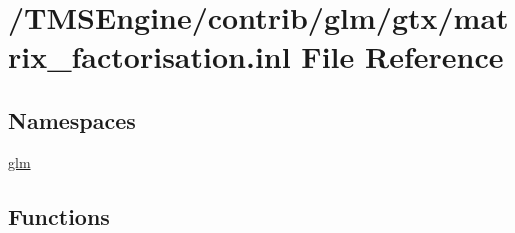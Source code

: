 \hypertarget{matrix__factorisation_8inl}{}\section{/\+T\+M\+S\+Engine/contrib/glm/gtx/matrix\+\_\+factorisation.inl File Reference}
\label{matrix__factorisation_8inl}
\subsection*{Namespaces}
\begin{DoxyCompactItemize}
\item 
 \hyperlink{namespaceglm}{glm}
\end{DoxyCompactItemize}
\subsection*{Functions}
